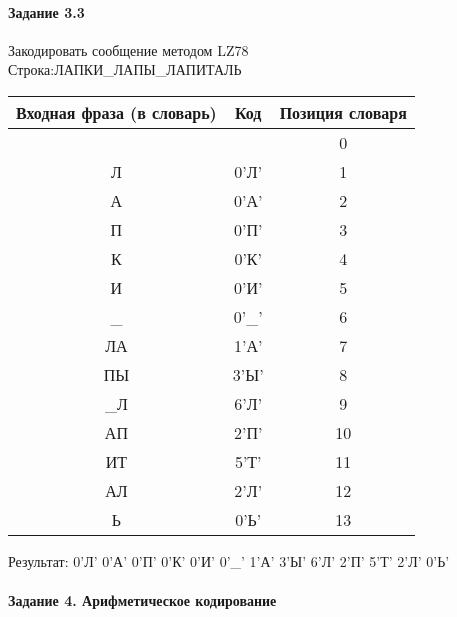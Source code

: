 \documentclass[a4paper, 12pt]{article}
\begin{document}
\paragraph{Задание 3.3}

Закодировать сообщение методом LZ78\\
Строка:ЛАПКИ\_ЛАПЫ\_ЛАПИТАЛЬ\\
\begin{table}[h!]
\centering
\begin{tabular}{|c|c|c|} 
\hline
 Входная фраза (в словарь) & Код & Позиция словаря \\ \hline

 &  & 0 \\ \hline
Л & 0'Л' & 1 \\ \hline
А & 0'А' & 2 \\ \hline
П & 0'П' & 3 \\ \hline
К & 0'К' & 4 \\ \hline
И & 0'И' & 5 \\ \hline
\_ & 0'\_' & 6 \\ \hline
ЛА & 1'А' & 7 \\ \hline
ПЫ & 3'Ы' & 8 \\ \hline
\_Л & 6'Л' & 9 \\ \hline
АП & 2'П' & 10 \\ \hline
ИТ & 5'Т' & 11 \\ \hline
АЛ & 2'Л' & 12 \\ \hline
Ь & 0'Ь' & 13 \\ \hline
\end{tabular}
\end{table}

Результат: 0'Л' 0'А' 0'П' 0'К' 0'И' 0'\_' 1'А' 3'Ы' 6'Л' 2'П' 5'Т' 2'Л' 0'Ь'\\
\pagebreak
\paragraph{Задание 4. Арифметическое кодирование\\}
\end{document}
